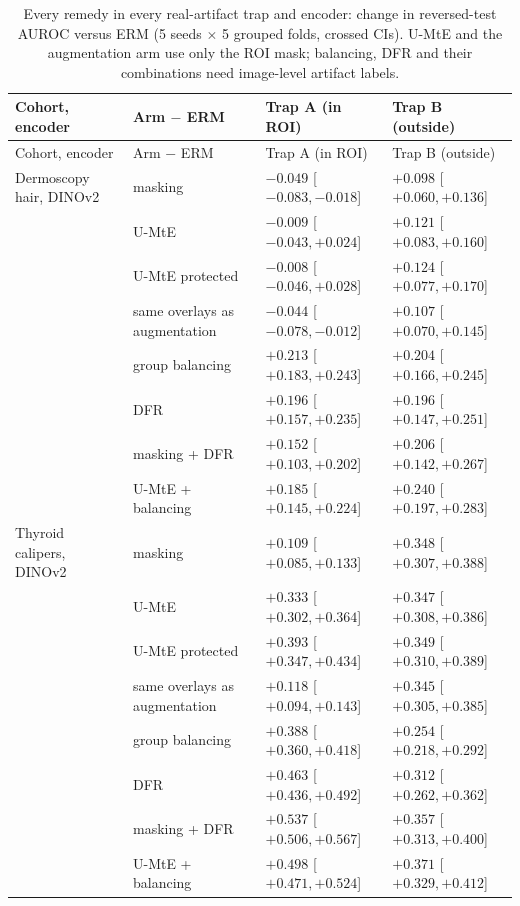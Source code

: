 {\scriptsize
\begin{longtable}{p{3.4cm}p{4.2cm}p{3.5cm}p{3.5cm}}
\caption{Every remedy in every real-artifact trap and encoder: change in reversed-test AUROC versus ERM (5 seeds $\times$ 5 grouped folds, crossed CIs). U-MtE and the augmentation arm use only the ROI mask; balancing, DFR and their combinations need image-level artifact labels.}\label{tab:remall}\\\toprule
Cohort, encoder & Arm $-$ ERM & Trap A (in ROI) & Trap B (outside) \\\midrule
\endfirsthead
\toprule Cohort, encoder & Arm $-$ ERM & Trap A (in ROI) & Trap B (outside) \\\midrule
\endhead
\bottomrule
\endlastfoot
Dermoscopy hair, DINOv2 & masking & $-0.049$ [$-0.083, -0.018$] & $+0.098$ [$+0.060, +0.136$] \\
 & U-MtE & $-0.009$ [$-0.043, +0.024$] & $+0.121$ [$+0.083, +0.160$] \\
 & U-MtE protected & $-0.008$ [$-0.046, +0.028$] & $+0.124$ [$+0.077, +0.170$] \\
 & same overlays as augmentation & $-0.044$ [$-0.078, -0.012$] & $+0.107$ [$+0.070, +0.145$] \\
 & group balancing & $+0.213$ [$+0.183, +0.243$] & $+0.204$ [$+0.166, +0.245$] \\
 & DFR & $+0.196$ [$+0.157, +0.235$] & $+0.196$ [$+0.147, +0.251$] \\
 & masking + DFR & $+0.152$ [$+0.103, +0.202$] & $+0.206$ [$+0.142, +0.267$] \\
 & U-MtE + balancing & $+0.185$ [$+0.145, +0.224$] & $+0.240$ [$+0.197, +0.283$] \\
Thyroid calipers, DINOv2 & masking & $+0.109$ [$+0.085, +0.133$] & $+0.348$ [$+0.307, +0.388$] \\
 & U-MtE & $+0.333$ [$+0.302, +0.364$] & $+0.347$ [$+0.308, +0.386$] \\
 & U-MtE protected & $+0.393$ [$+0.347, +0.434$] & $+0.349$ [$+0.310, +0.389$] \\
 & same overlays as augmentation & $+0.118$ [$+0.094, +0.143$] & $+0.345$ [$+0.305, +0.385$] \\
 & group balancing & $+0.388$ [$+0.360, +0.418$] & $+0.254$ [$+0.218, +0.292$] \\
 & DFR & $+0.463$ [$+0.436, +0.492$] & $+0.312$ [$+0.262, +0.362$] \\
 & masking + DFR & $+0.537$ [$+0.506, +0.567$] & $+0.357$ [$+0.313, +0.400$] \\
 & U-MtE + balancing & $+0.498$ [$+0.471, +0.524$] & $+0.371$ [$+0.329, +0.412$] \\

\end{longtable}}
